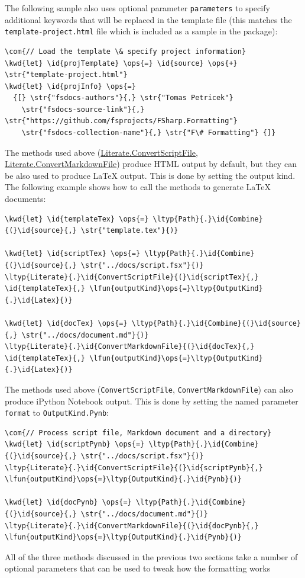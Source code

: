 \documentclass{article}
\newcommand{\id}[1]{\textcolor{black}{#1}}
\newcommand{\com}[1]{\textcolor{officegreen}{#1}}
\newcommand{\kwd}[1]{\textcolor{navy}{#1}}
\newcommand{\ops}[1]{\textcolor{purple}{#1}}
\newcommand{\str}[1]{\textcolor{olive}{#1}}
\begin{document}
The following sample also uses optional parameter \texttt{parameters} to specify additional
keywords that will be replaced in the template file (this matches the \texttt{template-project.html}
file which is included as a sample in the package):
\begin{Verbatim}[commandchars=\\\{\}]
\com{// Load the template \& specify project information}
\kwd{let} \id{projTemplate} \ops{=} \id{source} \ops{+} \str{"template-project.html"}
\kwd{let} \id{projInfo} \ops{=}
  {[} \str{"fsdocs-authors"}{,} \str{"Tomas Petricek"}
    \str{"fsdocs-source-link"}{,} \str{"https://github.com/fsprojects/FSharp.Formatting"}
    \str{"fsdocs-collection-name"}{,} \str{"F\# Formatting"} {]}
\end{Verbatim}



The methods used above (\href{https://fsprojects.github.io/FSharp.Formatting/reference/fsharp-formatting-literate-literate.html}{Literate.ConvertScriptFile}, \href{https://fsprojects.github.io/FSharp.Formatting/reference/fsharp-formatting-literate-literate.html}{Literate.ConvertMarkdownFile})
produce HTML output by default, but they can be also used to produce LaTeX output. This is done
by setting the output kind. The following
example shows how to call the methods to generate LaTeX documents:
\begin{Verbatim}[commandchars=\\\{\}]
\kwd{let} \id{templateTex} \ops{=} \ltyp{Path}{.}\id{Combine}{(}\id{source}{,} \str{"template.tex"}{)}

\kwd{let} \id{scriptTex} \ops{=} \ltyp{Path}{.}\id{Combine}{(}\id{source}{,} \str{"../docs/script.fsx"}{)}
\ltyp{Literate}{.}\id{ConvertScriptFile}{(}\id{scriptTex}{,} \id{templateTex}{,} \lfun{outputKind}\ops{=}\ltyp{OutputKind}{.}\id{Latex}{)}

\kwd{let} \id{docTex} \ops{=} \ltyp{Path}{.}\id{Combine}{(}\id{source}{,} \str{"../docs/document.md"}{)}
\ltyp{Literate}{.}\id{ConvertMarkdownFile}{(}\id{docTex}{,} \id{templateTex}{,} \lfun{outputKind}\ops{=}\ltyp{OutputKind}{.}\id{Latex}{)}
\end{Verbatim}



The methods used above (\texttt{ConvertScriptFile}, \texttt{ConvertMarkdownFile})
can also produce iPython Notebook output. This is done
by setting the named parameter \texttt{format} to \texttt{OutputKind.Pynb}:
\begin{Verbatim}[commandchars=\\\{\}]
\com{// Process script file, Markdown document and a directory}
\kwd{let} \id{scriptPynb} \ops{=} \ltyp{Path}{.}\id{Combine}{(}\id{source}{,} \str{"../docs/script.fsx"}{)}
\ltyp{Literate}{.}\id{ConvertScriptFile}{(}\id{scriptPynb}{,} \lfun{outputKind}\ops{=}\ltyp{OutputKind}{.}\id{Pynb}{)}

\kwd{let} \id{docPynb} \ops{=} \ltyp{Path}{.}\id{Combine}{(}\id{source}{,} \str{"../docs/document.md"}{)}
\ltyp{Literate}{.}\id{ConvertMarkdownFile}{(}\id{docPynb}{,} \lfun{outputKind}\ops{=}\ltyp{OutputKind}{.}\id{Pynb}{)}
\end{Verbatim}



All of the three methods discussed in the previous two sections take a number of optional
parameters that can be used to tweak how the formatting works
\end{document}
